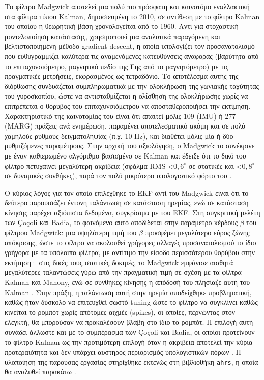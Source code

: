 \documentclass[11pt]{report}
\begin{document}
Το φίλτρο Madgwick αποτελεί μια πολύ πιο πρόσφατη και καινοτόμο εναλλακτική
στα φίλτρα τύπου Kalman, δημοσιευμένη το 2010, σε αντίθεση με το φίλτρο
Kalman του οποίου η θεωρητική βάση χρονολογείται από το 1960. Αντί για
στοχαστική μοντελοποίηση κατάστασης, χρησιμοποιεί μια αναλυτικά παραγόμενη
και βελτιστοποιημένη μέθοδο gradient descent, η οποία υπολογίζει τον
προσανατολισμό που ευθυγραμμίζει καλύτερα τις αναμενόμενες κατευθύνσεις
αναφοράς (βαρύτητα από το επιταχυνσιόμετρο, μαγνητικό πεδίο της Γης από το
μαγνητόμετρο) με τις πραγματικές μετρήσεις, εκφρασμένος ως τετραδόνιο. Το
αποτέλεσμα αυτής της διόρθωσης συνδυάζεται συμπληρωματικά με την ολοκλήρωση
της γωνιακής ταχύτητας του γυροσκοπίου, ώστε να αντισταθμίζεται η ολίσθηση
της ολοκλήρωσης χωρίς να επιτρέπεται ο θόρυβος του επιταχυνσιόμετρου να
αποσταθεροποιήσει την εκτίμηση. Χαρακτηριστικό της καινοτομίας του είναι ότι
απαιτεί μόλις 109 (IMU) ή 277 (MARG) πράξεις ανά ενημέρωση, παραμένει
αποτελεσματικό ακόμη και σε πολύ χαμηλούς ρυθμούς δειγματοληψίας (π.χ. 10
Hz), και διαθέτει μόλις μία ή δύο ρυθμιζόμενες παραμέτρους. Στην αρχική του
αξιολόγηση, ο Madgwick το συνέκρινε με έναν καθιερωμένο αλγόριθμο βασισμένο
σε Kalman και έδειξε ότι το δικό του φίλτρο πετυχαίνει μεγαλύτερη ακρίβεια
(σφάλμα RMS {\textless}$0{,}6^\circ$ σε στατικές και {\textless}$0{,}8^\circ$
σε δυναμικές συνθήκες), παρά τον πολύ μικρότερο υπολογιστικό φόρτο του
\cite{madgwick_efficient_2010}.

Ο κύριος λόγος για τον οποίο επιλέχθηκε το EKF αντί του Madgwick είναι ότι το
δεύτερο παρουσιάζει έντονη ταλάντωση σε κατάσταση ηρεμίας, ενώ σε κατάσταση
κίνησης παρέχει αξιόπιστα δεδομένα, συγκρίσιμα με του EKF. Στη συγκριτική
μελέτη των Çoçoli και Badia, το φαινόμενο αυτό αποδίδεται στην παράμετρο
κέρδους $\beta$ του φίλτρου Madgwick: μια υψηλότερη τιμή του $\beta$
προσφέρει μεγαλύτερο εύρος ζώνης απόκρισης, ώστε το φίλτρο να ακολουθεί
γρήγορες αλλαγές προσανατολισμού το ίδιο γρήγορα με τα υπόλοιπα φίλτρα, με
αντίτιμο την είσοδο περισσότερου θορύβου στην εκτίμηση· στις δικές τους
στατικές δοκιμές, το Madgwick εμφάνισε αισθητά μεγαλύτερες ταλαντώσεις γύρω
από την πραγματική τιμή σε σχέση με τα φίλτρα Kalman και Mahony, ενώ σε
συνθήκες κίνησης η απόδοσή του πλησίαζε αυτή του Kalman
\cite{cocoli_comparative_2023}. Στην πράξη, η ταλάντωση αυτή στην ηρεμία
αποδείχθηκε προβληματική, καθώς ήταν δύσκολο να επιτευχθεί σωστό tuning
ώστε το φίλτρο να συγκλίνει καθώς κινείται το ρομπότ χωρίς απότομες αιχμές
(spikes), οι οποίες, περνώντας στον ελεγκτή, θα μπορούσαν να προκαλέσουν
βλάβη στο ίδιο το ρομπότ. Η επιλογή αυτή συνάδει άλλωστε και με το
συμπέρασμα των Çoçoli και Badia, οι οποίοι προτείνουν το φίλτρο Kalman ως
την προτιμότερη επιλογή όταν η ακρίβεια αποτελεί την κύρια προτεραιότητα και
δεν υπάρχει αυστηρός περιορισμός υπολογιστικών πόρων
\cite{cocoli_comparative_2023}. Η υλοποίηση της παρούσας εργασίας
στηρίχθηκε εκτενώς στη βιβλιοθήκη \texttt{ahrs}, η οποία θα αναλυθεί
παρακάτω \cite{garcia_ahrs}.
\end{document}
